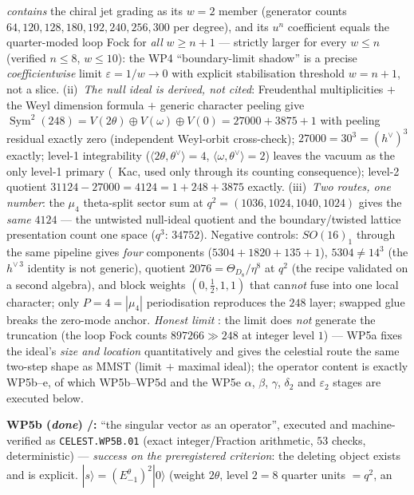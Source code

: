 \emph{contains} the chiral jet grading as its $w{=}2$ member (generator counts
$64,120,128,180,192,240,256,300$ per degree), and its $u^n$ coefficient equals the quarter-moded loop
Fock for \emph{all} $w\ge n{+}1$ --- strictly larger for every $w\le n$ (verified $n\le8$, $w\le10$):
the WP4 ``boundary-limit shadow'' is a precise \emph{coefficientwise} limit $\varepsilon=1/w\to0$ with
explicit stabilisation threshold $w=n{+}1$, not a slice. (ii)~\emph{The null ideal is derived, not
cited}: Freudenthal multiplicities $+$ the Weyl dimension formula $+$ generic character peeling give
$\operatorname{Sym}^2(248)=V(2\theta)\oplus V(\omega)\oplus V(0)=27000+3875+1$ with peeling residual
exactly zero (independent Weyl-orbit cross-check); $27000=30^3=(h^\vee)^3$ exactly; level-1
integrability ($\langle2\theta,\theta^\vee\rangle=4$, $\langle\omega,\theta^\vee\rangle=2$) leaves the
vacuum as the only level-1 primary (\mC\ Kac, used only through its counting consequence); level-2
quotient $31124-27000=4124=1+248+3875$ exactly. (iii)~\emph{Two routes, one number}: the $\mu_4$
theta-split sector sum at $q^2=(1036,1024,1040,1024)$ gives the \emph{same} $4124$ --- the untwisted
null-ideal quotient and the boundary/twisted lattice presentation count one space ($q^3$: $34752$).
Negative controls: $SO(16)_1$ through the same pipeline gives \emph{four} components
($5304+1820+135+1$), $5304\neq14^3$ (the $h^{\vee\,3}$ identity is not generic), quotient
$2076=\Theta_{D_8}/\eta^8$ at $q^2$ (the recipe validated on a second algebra), and block weights
$(0,\tfrac12,1,1)$ that can\emph{not} fuse into one local character; only $P=4=|\mu_4|$ periodisation
reproduces the $248$ layer; swapped glue breaks the zero-mode anchor. \emph{Honest limit} \mO: the
limit does \emph{not} generate the truncation (the loop Fock counts $897266\gg248$ at integer level
$1$) --- WP5a fixes the ideal's \emph{size and location} quantitatively and gives the celestial route
the same two-step shape as MMST (limit $+$ maximal ideal); the operator content is exactly WP5b--e,
of which WP5b--WP5d and the WP5e $\alpha$, $\beta$, $\gamma$, $\delta_2$ and $\varepsilon_2$ stages are executed below.
\item \textbf{WP5b (\emph{done}) \mE/\mC:} ``the singular vector as an operator'', executed and
machine-verified as \texttt{CELEST.WP5B.01}  (exact
integer/Fraction arithmetic, $53$ checks, deterministic) --- \emph{success on the preregistered
criterion}: the deleting object exists and is explicit.
$|s\rangle=(E^\theta_{-1})^2|0\rangle$ (weight $2\theta$, level $2=8$ quarter units $=q^2$, an
